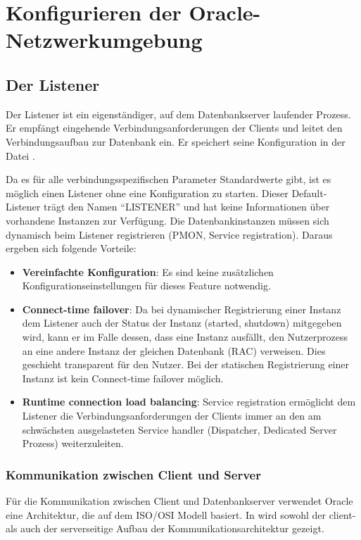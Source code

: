   \chapter{Konfigurieren der Oracle-Netzwerkumgebung}
    \setcounter{page}{1}
    \minitoc
\newpage
    \section{Der Listener}
      Der Listener ist ein eigenst\"andiger, auf dem Datenbankserver laufender
      Prozess. Er empf\"angt eingehende Verbindungsanforderungen der Clients und
      leitet den Verbindungsaufbau zur Datenbank ein. Er speichert seine
      Konfiguration in der Datei .

      Da es f\"ur alle verbindungsspezifischen Parameter Standardwerte gibt, ist es m\"oglich einen Listener ohne eine Konfiguration zu starten. Dieser Default-Listener tr\"agt den Namen \enquote{LISTENER} und hat keine Informationen \"uber vorhandene Instanzen zur Verf\"ugung. Die Datenbankinstanzen m\"ussen sich dynamisch beim Listener registrieren (PMON, Service registration). Daraus ergeben sich folgende Vorteile:
      \begin{itemize}
        \item \textbf{Vereinfachte Konfiguration}: Es sind keine zus\"atzlichen Konfigurationseinstellungen f\"ur dieses Feature notwendig.
        \item \textbf{Connect-time failover}: Da bei dynamischer Registrierung einer Instanz dem Listener auch der Status der Instanz (started, shutdown) mitgegeben wird, kann er im Falle dessen, dass eine Instanz ausf\"allt, den Nutzerprozess an eine andere Instanz der gleichen Datenbank (RAC) verweisen. Dies geschieht transparent f\"ur den Nutzer. Bei der statischen Registrierung einer Instanz ist kein Connect-time failover m\"og\-lich.
        \item \textbf{Runtime connection load balancing}: Service registration erm\"oglicht dem Listener die Verbindungsanforderungen der Clients immer an den am schw\"achsten ausgelasteten Service handler (Dispatcher, Dedicated Server Prozess) weiterzuleiten.
      \end{itemize}
      \subsection{Kommunikation zwischen Client und Server}
        F\"ur die Kommunikation zwischen Client und Datenbankserver verwendet Oracle eine Architektur, die auf dem ISO/OSI Modell basiert.
        In  wird sowohl der client- als auch der serverseitige Aufbau der Kommunikationsarchitektur gezeigt.

